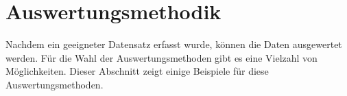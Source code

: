 \section{Auswertungsmethodik}
\label{sec:methodik}
Nachdem ein geeigneter Datensatz erfasst wurde, können die Daten ausgewertet werden.
Für die Wahl der Auswertungsmethoden gibt es eine Vielzahl von Möglichkeiten.
Dieser Abschnitt zeigt einige Beispiele für diese Auswertungsmethoden.

